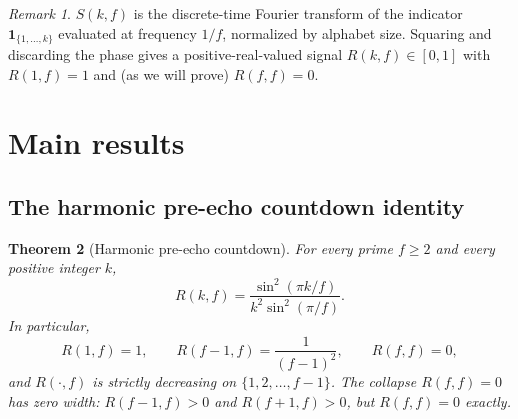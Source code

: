 \documentclass[11pt,reqno]{amsart}
\theoremstyle{plain}
\newtheorem{theorem}{Theorem}[section]
\theoremstyle{definition}
\theoremstyle{remark}
\newtheorem{remark}[theorem]{Remark}
\begin{document}
\begin{remark}
$S(k, f)$ is the discrete-time Fourier transform of the indicator
$\mathbf{1}_{\{1, \ldots, k\}}$ evaluated at frequency $1/f$,
normalized by alphabet size. Squaring and discarding the phase
gives a positive-real-valued signal $R(k, f) \in [0, 1]$ with
$R(1, f) = 1$ and (as we will prove) $R(f, f) = 0$.
\end{remark}

\section{Main results}
\label{sec:main}

\subsection{The harmonic pre-echo countdown identity}

\begin{theorem}[Harmonic pre-echo countdown]
\label{thm:countdown}
For every prime $f \ge 2$ and every positive integer $k$,
\begin{equation}
  R(k, f) = \frac{\sin^2(\pi k / f)}{k^2 \sin^2(\pi / f)}.
  \label{eq:countdown}
\end{equation}
In particular,
\[
  R(1, f) = 1,
  \qquad
  R(f-1, f) = \frac{1}{(f-1)^2},
  \qquad
  R(f, f) = 0,
\]
and $R(\cdot, f)$ is strictly decreasing on $\{1, 2, \ldots, f - 1\}$.
The collapse $R(f, f) = 0$ has \emph{zero width}: $R(f - 1, f) > 0$
and $R(f + 1, f) > 0$, but $R(f, f) = 0$ exactly.
\end{theorem}
\end{document}
